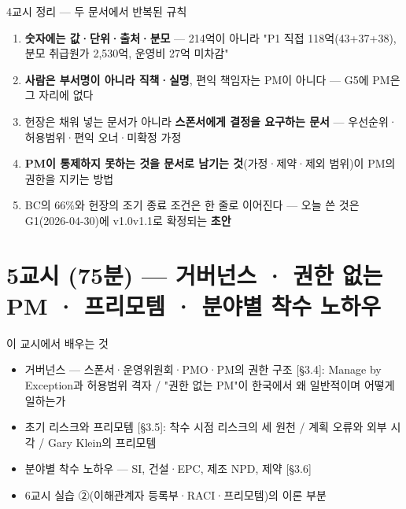 \begin{frame}{4교시 정리 — 두 문서에서 반복된 규칙}
\begin{enumerate}
\item \textbf{숫자에는 값·단위·출처·분모} — 214억이 아니라 "P1 직접 118억(43+37+38), 분모 취급원가 2,530억, 운영비 27억 미차감"
\item \textbf{사람은 부서명이 아니라 직책·실명}, 편익 책임자는 PM이 아니다 — G5에 PM은 그 자리에 없다
\item 헌장은 채워 넣는 문서가 아니라 \textbf{스폰서에게 결정을 요구하는 문서} — 우선순위·허용범위·편익 오너·미확정 가정
\item \textbf{PM이 통제하지 못하는 것을 문서로 남기는 것}(가정·제약·제외 범위)이 PM의 권한을 지키는 방법
\item BC의 66\%와 헌장의 조기 종료 조건은 한 줄로 이어진다 — 오늘 쓴 것은 G1(2026-04-30)에 v1.0\ra{}v1.1로 확정되는 \textbf{초안}
\end{enumerate}
\end{frame}

\section{5교시 (75분) — 거버넌스 · 권한 없는 PM · 프리모템 · 분야별 착수 노하우}

\begin{frame}{이 교시에서 배우는 것}
\begin{itemize}
\item 거버넌스 — 스폰서·운영위원회·PMO·PM의 권한 구조 [§3.4]: Manage by Exception과 허용범위 격자 / "권한 없는 PM"이 한국에서 왜 일반적이며 어떻게 일하는가
\item 초기 리스크와 프리모템 [§3.5]: 착수 시점 리스크의 세 원천 / 계획 오류와 외부 시각 / Gary Klein의 프리모템
\item 분야별 착수 노하우 — SI, 건설·EPC, 제조 NPD, 제약 [§3.6]
\item 6교시 실습 ②(이해관계자 등록부·RACI·프리모템)의 이론 부분
\end{itemize}
\end{frame}

